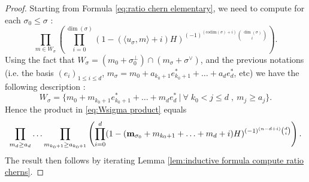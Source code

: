 \documentclass[a4paper,10pt]{amsart}
\theoremstyle{plain}{
    \newtheorem{theorem}{Theorem}[section]
    \newtheorem{lemma}[theorem]{Lemma}
    \newtheorem{corollary}[theorem]{Corollary}
    \newtheorem{proposition}[theorem]{Proposition}
    \newtheorem{conjecture}[theorem]{Conjecture}
}
\theoremstyle{definition}{
    \newtheorem{definition}[theorem]{Definition}
    \newtheorem{defn-thm}[theorem]{Definition-Theorem}
    \newtheorem{example}[theorem]{Example}
    \newtheorem{notation}[theorem]{Notation}
}
\theoremstyle{remark}{
    \newtheorem{remark}[theorem]{Remark}
    \newtheorem{problem}[theorem]{Problem}
    \newtheorem{question}[theorem]{Question}
}
\def\um{{\bf m}}
\def\codim{\mathrm{codim}}
\begin{document}
\begin{proof}
 Starting from Formula \eqref{eq:ratio chern elementary}, we need to compute for each $\sigma_0\leq\sigma$ :
 \begin{equation}
  \label{eq:Wsigma product}
 \prod_{m\in W_\sigma}\left(\prod_{i=0}^{\dim(\sigma)}(1-(\langle u_\sigma,m\rangle+i)H)^{(-1)^{(\codim(\sigma)+i)}\binom{\dim(\sigma)}{i}}\right).
 \end{equation}
 Using the fact that $W_\sigma= (m_0+\sigma_0^\perp)\cap (m_\sigma+\sigma^\vee)$, and the previous notations (i.e. the basis $(e_i)_{1\leq i\leq d}$, $m_\sigma=m_0+a_{k_0+1}e_{k_0+1}^*+\ldots+a_d e_d^*$, etc) we have the following description :
 $$
 W_\sigma=\lbrace m_0+m_{k_0+1}e_{k_0+1}^*+\ldots+m_d e_d^*\:\vert\:\forall\; k_0<j\leq d\;,\: m_j\geq a_j \rbrace.
 $$
 Hence the product in \eqref{eq:Wsigma product} equals
 $$
 \prod_{m_d\geq a_d}\ldots\prod_{m_{k_0+1}\geq a_{k_0+1}}\left(\prod_{i=0}^{d}(1-(\um_{\sigma_0}+m_{k_0+1}+\ldots+m_d+i)H)^{(-1)^{(n-d+i)}\binom{d}{i}}\right).
 $$
 The result then follows by iterating Lemma \ref{lem:inductive formula compute ratio cherns}.
\end{proof}
\end{document}
